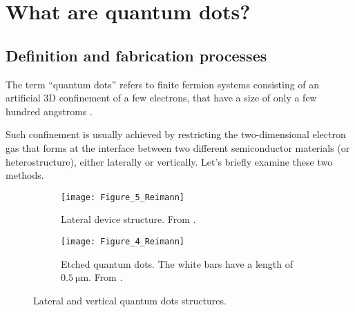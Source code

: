 
\graphicspath{{Mainmatter/figures/PNG/}{Mainmatter/figures/PDF/}{Mainmatter/figures/}}

\chapter{What are quantum dots?}

\section{Definition and fabrication processes}
The term ``quantum dots'' refers to finite fermion systems consisting of an artificial 3D confinement of a few electrons, that have a size of only a few hundred angstroms \citep{Reimann2002, Kastner1993}.

Such confinement is usually achieved by restricting the two-dimensional electron gas that forms at the interface between two different semiconductor materials (or heterostructure), either laterally or vertically. Let's briefly examine these two methods.

\begin{figure}[h]%
	\centering
	\begin{subfigure}[t]{0.5\textwidth}
		\texttt{[image: Figure\_5\_Reimann]}
		\caption{Lateral device structure. From \cite{Meirav1990}.}
		\label{fig:Figure_5_Reimann}
    \end{subfigure}
	\begin{subfigure}[t]{0.4\textwidth}
		\texttt{[image: Figure\_4\_Reimann]}
		\caption{Etched quantum dots. The white bars have a length of $\SI{0.5}{\micro\meter}$. From \cite{Reed1988}.}
		\label{fig:Figure_4_Reimann}
    \end{subfigure}
    \caption{Lateral and vertical quantum dots structures.}
	\label{fig:Figures_4-5_Reimann}
\end{figure}

